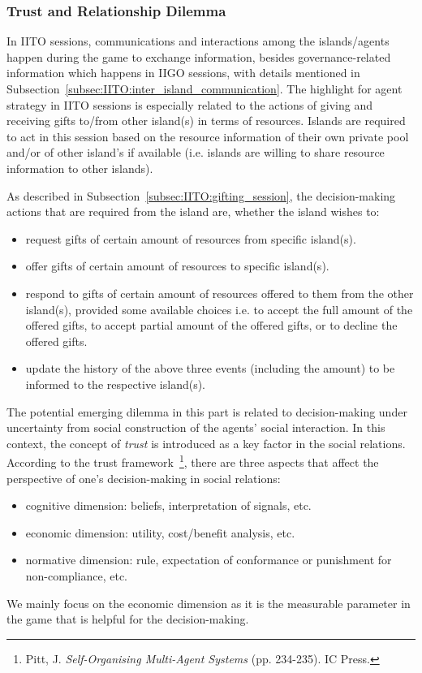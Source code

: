 \subsubsection{Trust and Relationship Dilemma} \label{subsubsec:Team6_IITO:Dilemma}
In IITO sessions, communications and interactions among the islands/agents happen during the game to exchange information, besides governance-related information which happens in IIGO sessions, with details mentioned in Subsection~\ref{subsec:IITO:inter_island_communication}. The highlight for agent strategy in IITO sessions is especially related to the actions of giving and receiving gifts to/from other island(s) in terms of resources. Islands are required to act in this session based on the resource information of their own private pool and/or of other island's if available (i.e. islands are willing to share resource information to other islands).

As described in Subsection~\ref{subsec:IITO:gifting_session}, the decision-making actions that are required from the island are, whether the island wishes to:
\begin{itemize}
    \item request gifts of certain amount of resources from specific island(s).
    \item offer gifts of certain amount of resources to specific island(s).
    \item respond to gifts of certain amount of resources offered to them from the other island(s), provided some available choices i.e. to accept the full amount of the offered gifts, to accept partial amount of the offered gifts, or to decline the offered gifts.
    \item update the history of the above three events (including the amount) to be informed to the respective island(s).
\end{itemize}

The potential emerging dilemma in this part is related to decision-making under uncertainty from social construction of the agents' social interaction. In this context, the concept of \emph{trust} is introduced as a key factor in the social relations. According to the trust framework~\footnote{Pitt, J. \textit{Self-Organising Multi-Agent Systems} (pp. 234-235). IC Press.}, there are three aspects that affect the perspective of one's decision-making in social relations:
\begin{itemize}
    \item cognitive dimension: beliefs, interpretation of signals, etc.
    \item economic dimension: utility, cost/benefit analysis, etc.
    \item normative dimension: rule, expectation of conformance or punishment for non-compliance, etc.
\end{itemize}
We mainly focus on the economic dimension as it is the measurable parameter in the game that is helpful for the decision-making.

